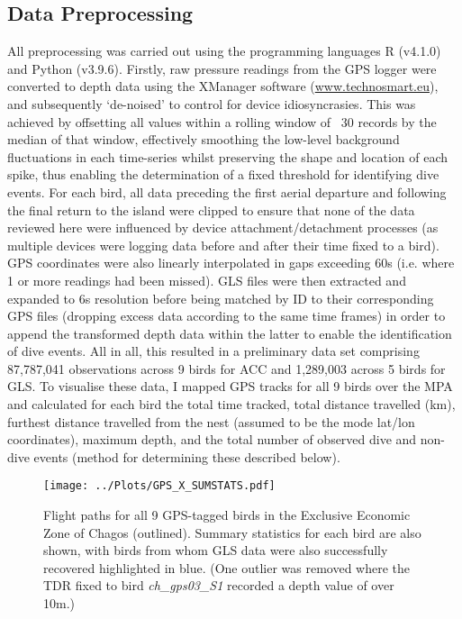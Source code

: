 \documentclass[11pt]{article}
\begin{document}
    \subsection{Data Preprocessing}
    All preprocessing was carried out using the programming languages R (v4.1.0) and Python (v3.9.6). Firstly, raw pressure readings from the GPS logger were converted to depth data using the XManager software (\url{www.technosmart.eu}), and subsequently ‘de-noised’ to control for device idiosyncrasies. This was achieved by offsetting all values within a rolling window of ~30 records by the median of that window, effectively smoothing the low-level background fluctuations in each time-series whilst preserving the shape and location of each spike, thus enabling the determination of a fixed threshold for identifying dive events. For each bird, all data preceding the first aerial departure and following the final return to the island were clipped to ensure that none of the data reviewed here were influenced by device attachment/detachment processes (as multiple devices were logging data before and after their time fixed to a bird). GPS coordinates were also linearly interpolated in gaps exceeding 60s (i.e. where 1 or more readings had been missed). GLS files were then extracted and expanded to 6s resolution before being matched by ID to their corresponding GPS files (dropping excess data according to the same time frames) in order to append the transformed depth data within the latter to enable the identification of dive events. All in all, this resulted in a preliminary data set comprising 87,787,041 observations across 9 birds for ACC and 1,289,003 across 5 birds for GLS. To visualise these data, I mapped GPS tracks for all 9 birds over the MPA and calculated for each bird the total time tracked, total distance travelled (km), furthest distance travelled from the nest (assumed to be the mode lat/lon coordinates), maximum depth, and the total number of observed dive and non-dive events (method for determining these described below).
    
    
    \begin{figure}
	    \centering\texttt{[image: ../Plots/GPS\_X\_SUMSTATS.pdf]}
	    \caption{Flight paths for all 9 GPS-tagged birds in the Exclusive Economic Zone of Chagos (outlined). Summary statistics for each bird are also shown, with birds from whom GLS data were also successfully recovered highlighted in blue. (One outlier was removed where the TDR fixed to bird \emph{ch\_gps03\_S1} recorded a depth value of over 10m.)}
    \end{figure}
    
\end{document}
